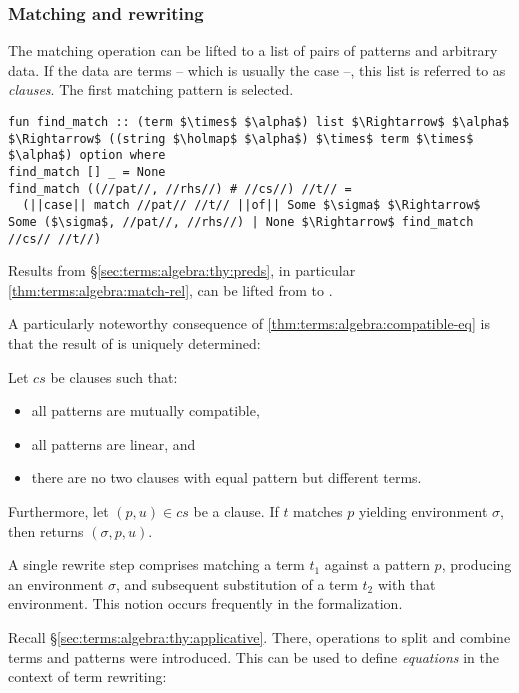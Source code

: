 \subsubsection{Matching and rewriting}
\label{sec:terms:algebra:thy:matching}

The matching operation can be lifted to a list of pairs of patterns and arbitrary data.
If the data are terms -- which is usually the case --, this list is referred to as \emph{clauses}.
The first matching pattern is selected.
%
\begin{lstlisting}[language=Isabelle]
fun find_match :: (term $\times$ $\alpha$) list $\Rightarrow$ $\alpha$ $\Rightarrow$ ((string $\holmap$ $\alpha$) $\times$ term $\times$ $\alpha$) option where
find_match [] _ = None
find_match ((//pat//, //rhs//) # //cs//) //t// =
  (||case|| match //pat// //t// ||of|| Some $\sigma$ $\Rightarrow$ Some ($\sigma$, //pat//, //rhs//) | None $\Rightarrow$ find_match //cs// //t//)
\end{lstlisting}
%
Results from §\ref{sec:terms:algebra:thy:preds}, in particular \cref{thm:terms:algebra:match-rel}, can be lifted from  to .

A particularly noteworthy consequence of \cref{thm:terms:algebra:compatible-eq} is that the result of  is uniquely determined:
%
\begin{lemma}\label{thm:terms:algebra:thy:find-match-compat}
  Let $\mathit{cs}$ be clauses such that:
  \begin{itemize}
    \item all patterns are mutually compatible,
    \item all patterns are linear, and
    \item there are no two clauses with equal pattern but different terms.
  \end{itemize}
  Furthermore, let $(p, u) \in \mathit{cs}$ be a clause.
  If $t$ matches $p$ yielding environment $\sigma$, then  returns $(\sigma, p, u)$.
\end{lemma}

\noindent
A single rewrite step comprises matching a term $t_1$ against a pattern $p$, producing an environment $\sigma$, and subsequent substitution of a term $t_2$ with that environment.
This notion occurs frequently in the formalization.

Recall §\ref{sec:terms:algebra:thy:applicative}.
There, operations to split and combine terms and patterns were introduced.
This can be used to define \emph{equations} in the context of term rewriting:

